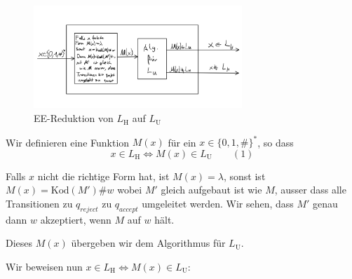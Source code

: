 \documentclass[a4paper, 11pt]{article}
\begin{document}
                        \begin{figure}[htp]
                            \centering
                            \includegraphics[width = 0.7\textwidth]{Images/17a_Zeichnung.png}
                            \caption{EE-Reduktion von $L_{\text{H}}$ auf $L_{\text{U}}$}
                        \end{figure}
                        
            
                    Wir definieren eine Funktion $M(x)$ für ein $x \in \{0,1,\#\}^*$, so dass
                        $$x \in L_{\text{H}} \iff M(x) \in L_{\text{U}} \qquad (1)$$
                    
                        Falls $x$ nicht die richtige Form hat, ist $M(x) = \lambda$, sonst ist $M(x) = \text{Kod}(M')\#w$ wobei $M'$ gleich aufgebaut ist wie $M$, ausser dass alle Transitionen zu $q_{reject}$ zu $q_{accept}$ umgeleitet werden. Wir sehen, dass $M'$ genau dann $w$ akzeptiert, wenn $M$ auf $w$ hält. 
                        
                        Dieses $M(x)$ übergeben wir dem Algorithmus für $L_{\text{U}}$. 
                
                        
                    Wir beweisen nun $x \in L_{\text{H}} \iff M(x) \in L_{\text{U}}$:
                
\end{document}
